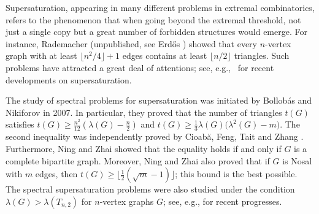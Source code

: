 \documentclass[11pt,a4paper]{article}
\newtheorem{conj}[theorem]{Conjecture}
\theoremstyle{definition}
\theoremstyle{remark}
\begin{document}

Supersaturation, appearing in many different problems in extremal combinatorics, refers to the phenomenon that when going beyond the extremal threshold, not just a single copy but a great number of forbidden structures would emerge. For instance, 
Rademacher (unpublished, see Erd\H{o}s \cite{Erd1955,Erdos1964}) showed that every 
$n$-vertex graph with at least $\lfloor n^2/4\rfloor +1$ edges contains at least $\lfloor n/2\rfloor$ triangles. Such problems have attracted a great deal of attentions; see, e.g.,~\cite{LS1975,LS1983,Mubayi2010,PY2017,HMY2021,LPS2020} for recent developments on  supersaturation. 

The study of spectral problems for supersaturation was initiated by
Bollob\'{a}s and Nikiforov \cite{BN2007} in 2007. In particular, they proved that the number of triangles $t(G)$ satisfies 
$t(G)\ge \frac{n^2}{12}(\lambda(G) - \frac{n}{2})$ and 
$t(G) \ge \frac{1}{3}\lambda(G) \bigl(\lambda^2(G) - m\bigr).$ 
The second inequality 
was independently proved by Cioab\u{a},  Feng,
Tait and Zhang \cite{CFTZ20}. 
Furthermore, Ning and Zhai \cite{NZ2021} showed that 
the equality holds if and only if 
$G$ is a complete bipartite graph. 
Moreover, Ning and Zhai also proved that if $G$ is Nosal with $m$ edges, 
 then $t(G)\ge \lfloor \frac{1}{2}(\sqrt{m}-1) \rfloor$; this bound is the best possible. 
The spectral supersaturation problems were also  
studied under the  condition $\lambda (G) > \lambda (T_{n,2})$ for $n$-vertex graphs $G$; 
see, e.g., \cite{NZ2021,ZL2022jgt,LFP2024-triangular,LFP-count-bowtie} for recent progresses. 
\end{document}

